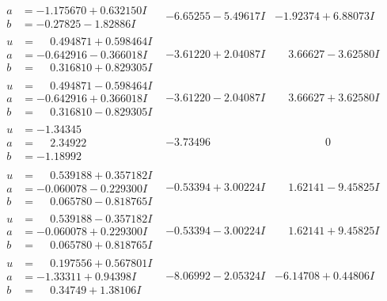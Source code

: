 \documentclass[1p]{elsarticle_modified}
\theoremstyle{definition}
\begin{document}
$$\begin{array}{c|c|c}
\begin{aligned}
a &= -1.175670 + 0.632150 I \\
b &= -0.27825 - 1.82886 I\end{aligned}
 & -6.65255 - 5.49617 I & -1.92374 + 6.88073 I \\ \hline\begin{aligned}
u &= \phantom{-}0.494871 + 0.598464 I \\
a &= -0.642916 - 0.366018 I \\
b &= \phantom{-}0.316810 + 0.829305 I\end{aligned}
 & -3.61220 + 2.04087 I & \phantom{-}3.66627 - 3.62580 I \\ \hline\begin{aligned}
u &= \phantom{-}0.494871 - 0.598464 I \\
a &= -0.642916 + 0.366018 I \\
b &= \phantom{-}0.316810 - 0.829305 I\end{aligned}
 & -3.61220 - 2.04087 I & \phantom{-}3.66627 + 3.62580 I \\ \hline\begin{aligned}
u &= -1.34345\phantom{ +0.000000I} \\
a &= \phantom{-}2.34922\phantom{ +0.000000I} \\
b &= -1.18992\phantom{ +0.000000I}\end{aligned}
 & -3.73496\phantom{ +0.000000I} & \phantom{-0.000000 } 0 \\ \hline\begin{aligned}
u &= \phantom{-}0.539188 + 0.357182 I \\
a &= -0.060078 - 0.229300 I \\
b &= \phantom{-}0.065780 - 0.818765 I\end{aligned}
 & -0.53394 + 3.00224 I & \phantom{-}1.62141 - 9.45825 I \\ \hline\begin{aligned}
u &= \phantom{-}0.539188 - 0.357182 I \\
a &= -0.060078 + 0.229300 I \\
b &= \phantom{-}0.065780 + 0.818765 I\end{aligned}
 & -0.53394 - 3.00224 I & \phantom{-}1.62141 + 9.45825 I \\ \hline\begin{aligned}
u &= \phantom{-}0.197556 + 0.567801 I \\
a &= -1.33311 + 0.94398 I \\
b &= \phantom{-}0.34749 + 1.38106 I\end{aligned}
 & -8.06992 - 2.05324 I & -6.14708 + 0.44806 I \\ \hline\begin{aligned}

\end{aligned}
\end{array}$$
\end{document}
